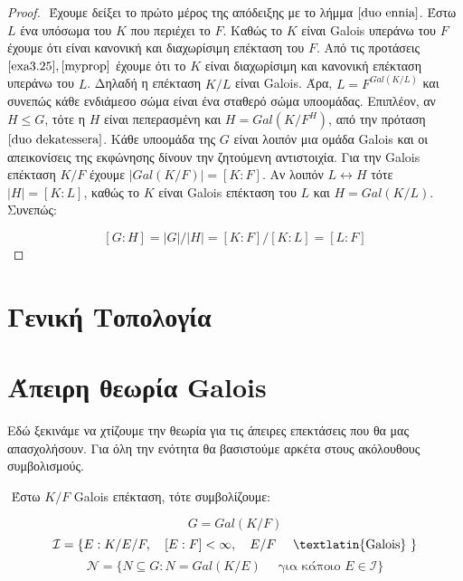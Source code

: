 \documentclass[oneside,a4paper]{article}
\newcommand {\tl}{\textlatin}
\begin{document}
\begin{proof}
	
	$ $\newline
	\noindent Έχουμε δείξει το πρώτο μέρος της απόδειξης με το λήμμα $\ref{duo ennia}$. Έστω $L$ ένα υπόσωμα του $K$ που περιέχει το $F$. Καθώς το $K$ είναι \tl{Galois} υπεράνω του $F$ έχουμε ότι είναι κανονική και διαχωρίσιμη επέκταση του $F$. Από τις προτάσεις $\ref{exa3.25},\ref{myprop}$ έχουμε ότι το $K$ είναι διαχωρίσιμη και κανονική επέκταση υπεράνω του $L$. Δηλαδή η επέκταση $K/L$ είναι \tl{Galois}. Άρα, $L = F^{Gal(K/L)}$ και συνεπώς κάθε ενδιάμεσο σώμα είναι ένα σταθερό σώμα υποομάδας. Επιπλέον, αν $H\leq G$, τότε η $H$ είναι πεπερασμένη και $H = Gal(K/F^H)$, από την πρόταση $\ref{duo dekatessera}$. Κάθε υποομάδα της $G$ είναι λοιπόν μια ομάδα \tl{Galois} και οι απεικονίσεις της εκφώνησης δίνουν την ζητούμενη αντιστοιχία. Για την \tl{Galois} επέκταση $K/F$ έχουμε $|Gal(K/F)| = [K:F]$. Αν λοιπόν $L \leftrightarrow H$ τότε $|H| = [K:L]$, καθώς το $K$ είναι \tl{Galois} επέκταση του $L$ και $H = Gal(K/L)$. Συνεπώς:
	
	$$[G:H] = |G|/|H| = [K:F] / [K:L] = [L:F]$$

\end{proof}



\pagebreak
\section{Γενική Τοπολογία}
\pagebreak
\section{Άπειρη θεωρία \tl{Galois}}
\vspace{1cm}

Εδώ ξεκινάμε να χτίζουμε την θεωρία για τις άπειρες επεκτάσεις που θα μας απασχολήσουν. Για όλη την ενότητα θα βασιστούμε αρκέτα στους ακόλουθους συμβολισμούς.

$ $\newline
\noindent Έστω $K/F$ \tl{Galois} επέκταση, τότε συμβολίζουμε:

$$G=Gal(K/F)$$
$$\mathcal{I} = \{ E: K/E/F , \quad [E:F]<\infty , \quad E/F \quad\text{ \tl{Galois} } \}$$
$$\mathcal{N} = \{N \subseteq G: N = Gal(K/E) \quad\text{ για κάποιo } E \in \mathcal{I} \}$$
\end{document}
